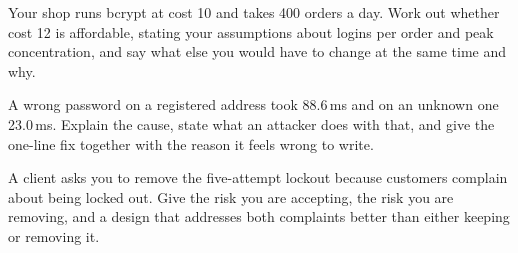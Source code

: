 \begin{checkpoint}
\begin{tightnum}
  \item Your shop runs bcrypt at cost 10 and takes 400 orders a day. Work out
        whether cost 12 is affordable, stating your assumptions about logins
        per order and peak concentration, and say what else you would have to
        change at the same time and why.
  \item A wrong password on a registered address took 88.6\,ms and on an
        unknown one 23.0\,ms. Explain the cause, state what an attacker does
        with that, and give the one-line fix together with the reason it feels
        wrong to write.
  \item A client asks you to remove the five-attempt lockout because customers
        complain about being locked out. Give the risk you are accepting, the
        risk you are removing, and a design that addresses both complaints
        better than either keeping or removing it.
\end{tightnum}
\end{checkpoint}


